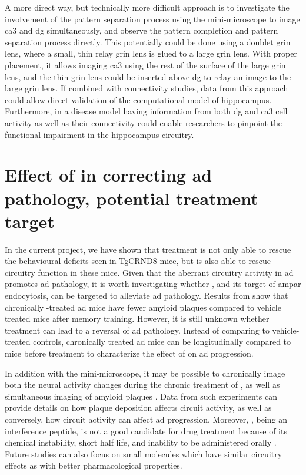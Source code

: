 A more direct way, but technically more difficult approach is to investigate the involvement of the pattern separation process using the mini-microscope to image \gls{ca3} and \gls{dg} simultaneously, and observe the pattern completion and pattern separation process directly. This potentially could be done using a doublet \gls{grin} lens, where a small, thin relay \gls{grin} lens is glued to a large \gls{grin} lens. With proper placement, it allows imaging \gls{ca3} using the rest of the surface of the large \gls{grin} lens, and the thin \gls{grin} lens could be inserted above \gls{dg} to relay an image to the large \gls{grin} lens. If combined with connectivity studies, data from this approach could allow direct validation of the computational model of hippocampus. Furthermore, in a disease model having information from both \gls{dg} and \gls{ca3} cell activity as well as their connectivity could enable researchers to pinpoint the functional impairment in the hippocampus circuitry.

\section{Effect of \tglu{} in correcting \gls{ad} pathology, potential treatment target}

In the current project, we have shown that \tglu{} treatment is not only able to rescue the behavioural deficits seen in TgCRND8 mice, but is also able to rescue circuitry function in these mice. Given that the aberrant circuitry activity in \gls{ad} promotes \gls{ad} pathology, it is worth investigating whether \tglu{}, and its target of \gls{ampar} endocytosis, can be targeted to alleviate \gls{ad} pathology. Results from \citet{dong15} show that chronically \tglu{}-treated \gls{ad} mice have fewer amyloid plaques compared to vehicle treated mice after memory training. However, it is still unknown whether \tglu{} treatment can lead to a reversal of \gls{ad} pathology. Instead of comparing to vehicle-treated controls, chronically treated \gls{ad} mice can be longitudinally compared to mice before treatment to characterize the effect of \tglu{} on \gls{ad} progression.

In addition with the mini-microscope, it may be possible to chronically image both the neural activity changes during the chronic treatment of \tglu{}, as well as simultaneous imaging of amyloid plaques \citep{zhang15}. Data from such experiments can provide details on how plaque deposition affects circuit activity, as well as conversely, how circuit activity can affect \gls{ad} progression. Moreover, \tglu{}, being an interference peptide, is not a good candidate for drug treatment because of its chemical instability, short half life, and inability to be administered orally \citep{fosgerau15}. Future studies can also focus on small molecules which have similar circuitry effects as \tglu{} with better pharmacological properties.

